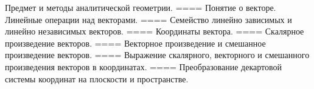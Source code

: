Предмет и методы аналитической геометрии.
====
Понятие о векторе. Линейные операции над векторами.
====
Семейство линейно зависимых и линейно независимых векторов.
====
Координаты вектора.
====
Скалярное произведение векторов.
====
Векторное произведение и смешанное произведение векторов.
====
Выражение скалярного, векторного и смешанного произведения векторов в координатах.
====
Преобразование декартовой системы координат на плоскости и пространстве.